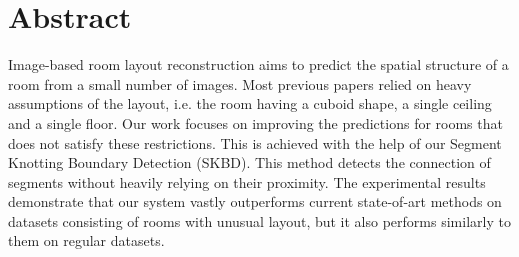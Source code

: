\section{Abstract}
Image-based room layout reconstruction aims to predict the spatial structure of a room from a small number of images. Most previous papers relied on heavy assumptions of the layout, i.e. the room having a cuboid shape, a single ceiling and a single floor. Our work focuses on improving the predictions for rooms that does not satisfy these restrictions. This is achieved with the help of our Segment Knotting Boundary Detection (SKBD). This method detects the connection of segments without heavily relying on their proximity. The experimental results demonstrate that our system vastly outperforms current state-of-art methods on datasets consisting of rooms with unusual layout, but it also performs similarly to them on regular datasets.
